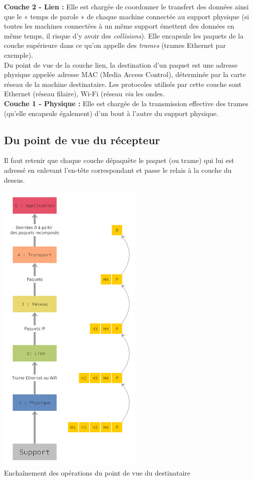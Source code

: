 \textbf{Couche 2 - Lien :} Elle est chargée de coordonner le transfert des données ainsi que le « temps de parole » de chaque machine connectée au support physique (si toutes les machines connectées à un même support émettent des données en même temps, il risque d'y avoir des \textit{collisions}). Elle encapsule les paquets de la couche supérieure dans ce qu'on appelle des \textit{trames} (trames Ethernet par exemple).\\
          Du point de vue de la couche lien, la destination d'un paquet est une adresse physique appelée adresse MAC (Media Access Control), déterminée par la carte réseau de la machine destinataire.
          Les protocoles utilisés par cette couche sont Ethernet (réseau filaire), Wi-Fi (réseau \textit{via} les ondes.\\
\textbf{Couche 1 - Physique :} Elle est chargée de la transmission effective des trames (qu'elle encapsule également) d'un bout à l'autre du support physique.


\subsection{Du point de vue du récepteur}

Il faut retenir que chaque couche dépaquète le paquet (ou trame) qui lui est adressé en enlevant l'en-tête correspondant et passe le relais à la couche du dessus.

\begin{center}
    \includegraphics[width=7cm]{ch-reseaux/img/modele_5_couches_down.png}\\
    \footnotesize{Enchaînement des opérations du point de vue du destinataire}
\end{center}
